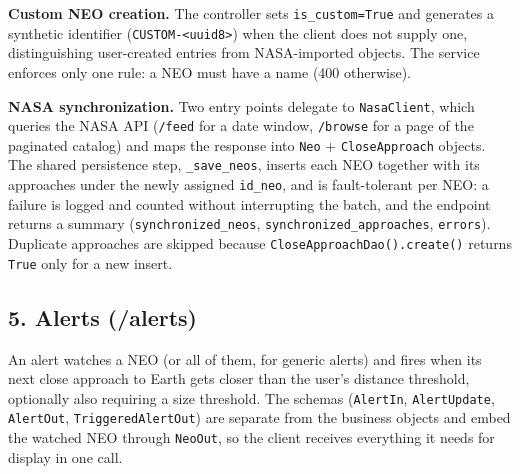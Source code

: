 \documentclass[
  french,
  11pt,
  a4paper,
]{report}
\begin{document}
\textbf{Custom NEO creation.} The controller sets
\texttt{is\_custom=True} and generates a synthetic identifier
(\texttt{CUSTOM-\textless{}uuid8\textgreater{}}) when the client does
not supply one, distinguishing user-created entries from NASA-imported
objects. The service enforces only one rule: a NEO must have a name (400
otherwise).

\textbf{NASA synchronization.} Two entry points delegate to
\texttt{NasaClient}, which queries the NASA API (\texttt{/feed} for a
date window, \texttt{/browse} for a page of the paginated catalog) and
maps the response into \texttt{Neo} + \texttt{CloseApproach} objects.
The shared persistence step, \texttt{\_save\_neos}, inserts each NEO
together with its approaches under the newly assigned \texttt{id\_neo},
and is fault-tolerant per NEO: a failure is logged and counted without
interrupting the batch, and the endpoint returns a summary
(\texttt{synchronized\_neos}, \texttt{synchronized\_approaches},
\texttt{errors}). Duplicate approaches are skipped because
\texttt{CloseApproachDao().create()} returns \texttt{True} only for a
new insert.

\subsection{5. Alerts (/alerts)}\label{alerts-alerts}

An alert watches a NEO (or all of them, for generic alerts) and fires
when its next close approach to Earth gets closer than the user's
distance threshold, optionally also requiring a size threshold. The
schemas (\texttt{AlertIn}, \texttt{AlertUpdate}, \texttt{AlertOut},
\texttt{TriggeredAlertOut}) are separate from the business objects and
embed the watched NEO through \texttt{NeoOut}, so the client receives
everything it needs for display in one call.
\end{document}
